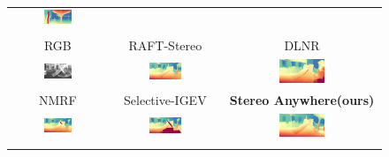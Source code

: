 \documentclass[10pt,twocolumn,letterpaper]{article}
\newcommand{\method}[0]{Stereo Anywhere\xspace}
\begin{document}
\begin{figure}[h]
\begin{tabular}{ccc}
        \includegraphics[width=0.31\textwidth]{imgs/ETH3D/stereo/Ours/15.jpg} \\ \\
        \small RGB &
        \small RAFT-Stereo \cite{lipson2021raft} &
        \small DLNR \cite{zhao2023high} \\
        \includegraphics[width=0.31\textwidth]{imgs/ETH3D/rgb/17.jpg} &
        \includegraphics[width=0.31\textwidth]{imgs/ETH3D/stereo/RAFT-Stereo/17.jpg} &
        \includegraphics[width=0.31\textwidth]{imgs/ETH3D/stereo/DLNR/17.jpg} \\
        \small NMRF \cite{guan2024neural} &
        \small Selective-IGEV \cite{wang2024selective} &
        \textbf{\method (ours)} \\
        \includegraphics[width=0.31\textwidth]{imgs/ETH3D/stereo/NMRF/17.jpg} &
        \includegraphics[width=0.31\textwidth]{imgs/ETH3D/stereo/Selective/17.jpg} &
        \includegraphics[width=0.31\textwidth]{imgs/ETH3D/stereo/Ours/17.jpg} \\ \\


\end{tabular}
\end{figure}
\end{document}
